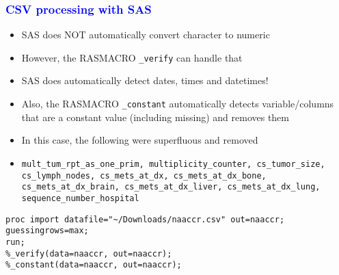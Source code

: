 \documentclass[11pt,pdftex,dvipsnames,usenames]{beamer}
\begin{document}
\begin{frame}[fragile]\frametitle{\bf\textcolor{blue}{CSV processing with SAS}}
\begin{itemize}
\item SAS does NOT automatically convert character to numeric
\item However, the RASMACRO \texttt{\_verify} can handle that
\item SAS does automatically detect dates, times and datetimes!
\item Also, the RASMACRO \texttt{\_constant} automatically detects
variable/columns that are a constant value (including missing) and
removes them
\item In this case, the following were superfluous and removed
\item \texttt{mult\_tum\_rpt\_as\_one\_prim, multiplicity\_counter, 
cs\_tumor\_size, cs\_lymph\_nodes, cs\_mets\_at\_dx, cs\_mets\_at\_dx\_bone, 
cs\_mets\_at\_dx\_brain, cs\_mets\_at\_dx\_liver, cs\_mets\_at\_dx\_lung, 
sequence\_number\_hospital}
\end{itemize}
\begin{verbatim}
proc import datafile="~/Downloads/naaccr.csv" out=naaccr;
guessingrows=max;
run;
%_verify(data=naaccr, out=naaccr);
%_constant(data=naaccr, out=naaccr);
\end{verbatim}

\end{frame}
\end{document}
